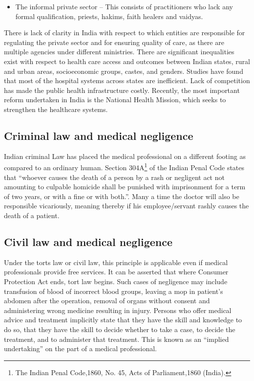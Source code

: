 \begin{multicols}{2}
\begin{itemize}
\item The informal private sector – This consists of practitioners who lack any formal qualification, priests, hakims, faith healers and vaidyas.
\end{itemize}

\noi
There is lack of clarity in India with respect to which entities are responsible for
regulating the private sector and for ensuring quality of care, as there are multiple
agencies under different ministries. There are significant inequalities exist with respect
to health care access and outcomes between Indian states, rural and urban areas,
socioeconomic groups, castes, and genders. Studies have found that most of the hospital
systems across states are inefficient. Lack of competition has made the public health
infrastructure costly. Recently, the most important reform undertaken in India is the
National Health Mission, which seeks to strengthen the healthcare systems.

\vspace{-.4cm}

\subsection*{Criminal law and medical negligence}

\vspace{-.2cm}

\noi
Indian criminal Law has placed the medical professional on a different footing as
compared to an ordinary human. Section 304A\footnote{The Indian Penal Code,1860, No. 45, Acts of Parliament,1860 (India).} of the Indian Penal Code states that “whoever causes the death of a person by a rash or negligent act not amounting to culpable homicide shall be punished with imprisonment for a term of two years, or with a fine or with both.”. Many a time the doctor will also be responsible vicariously, meaning thereby if his employee/servant rashly causes the death of a patient.

\vspace{-.4cm}

\subsection*{Civil law and medical negligence}

\vspace{-.2cm}

\noi
Under the torts law or civil law, this principle is applicable even if medical professionals
provide free services. It can be asserted that where Consumer Protection Act ends, tort
law begins. Such cases of negligence may include transfusion of blood of incorrect
blood groups, leaving a mop in patient’s abdomen after the operation, removal of organs
without consent and administering wrong medicine resulting in injury. Persons who
offer medical advice and treatment implicitly state that they have the skill and
knowledge to do so, that they have the skill to decide whether to take a case, to decide the treatment, and to administer that treatment. This is known as an “implied
undertaking” on the part of a medical professional.


\end{multicols}
